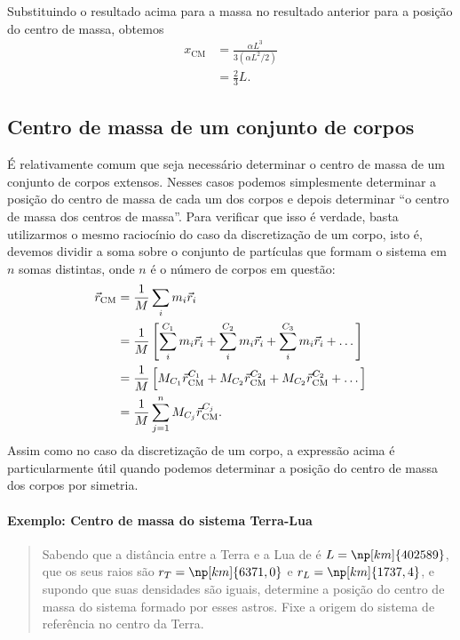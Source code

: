 Substituindo o resultado acima para a massa no resultado anterior para a posição do centro de massa, obtemos
\begin{align}
    x_{\text{CM}} &= \frac{\alpha L^3}{3(\alpha L^2 /2)} \\
    &= \frac{2}{3} L.
\end{align}
    
\subsection{Centro de massa de um conjunto de corpos}

É relativamente comum que seja necessário determinar o centro de massa de um conjunto de corpos extensos. Nesses casos podemos simplesmente determinar a posição do centro de massa de cada um dos corpos e depois determinar ``o centro de massa dos centros de massa''. Para verificar que isso é verdade, basta utilizarmos o mesmo raciocínio do caso da discretização de um corpo, isto é, devemos dividir a soma sobre o conjunto de partículas que formam o sistema em $n$ somas distintas, onde $n$ é o número de corpos em questão:
\begin{align}
    \vec{r}_{\rm{CM}} &= \frac{1}{M} \sum_{i} m_i \vec{r}_i \\
    &= \frac{1}{M} \left[ \sum_{i}^{C_1} m_i \vec{r}_i + \sum_{i}^{C_2} m_i \vec{r}_i +\sum_{i}^{C_3} m_i \vec{r}_i + \dots\right] \\
    &= \frac{1}{M} \left[ M_{C_1} \vec{r}_{\text{CM}}^{C_1} + M_{C_2} \vec{r}_{\text{CM}}^{C_2} + M_{C_2} \vec{r}_{\text{CM}}^{C_2} + \dots \right] \\
    &= \frac{1}{M} \sum_{j=1}^n M_{C_j} \vec{r}_{\text{CM}}^{C_j}. \label{Eq:CMConjuntoDeCorpos}
\end{align}
%
Assim como no caso da discretização de um corpo, a expressão acima é particularmente útil quando podemos determinar a posição do centro de massa dos corpos por simetria.

\paragraph{Exemplo: Centro de massa do sistema Terra-Lua}

\begin{quote}
    Sabendo que a distância entre a Terra e a Lua de é $L = \np[km]{402589}$, que os seus raios são $r_T = \np[km]{6371,0}$ e $r_L = \np[km]{1737,4}$, e supondo que suas densidades são iguais, determine a posição do centro de massa do sistema formado por esses astros. Fixe a origem do sistema de referência no centro da Terra.
\end{quote}


